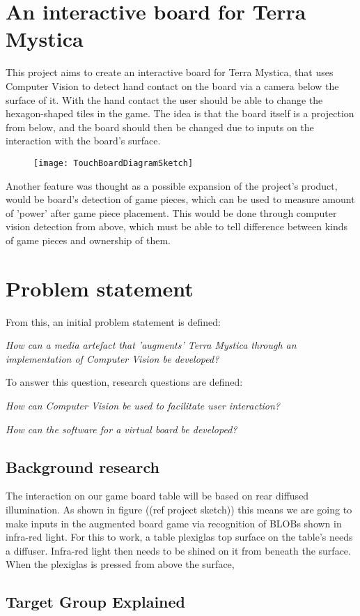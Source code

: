 \section{An interactive board for Terra Mystica}
This project aims to create an interactive board for Terra Mystica, that uses Computer Vision to detect hand contact on the board via a camera below the surface of it. With the hand contact the user should be able to change the hexagon-shaped tiles in the game. The idea is that the board itself is a projection from below, and the board should then be changed due to inputs on the interaction with the board's surface. 

\begin{figure}[!h]
\centering	\texttt{[image: TouchBoardDiagramSketch]}
\end{figure}

Another feature was thought as a possible expansion of the project's product, would be board's detection of game pieces, which can be used to measure amount of 'power' after game piece placement. This would be done through computer vision detection from above, which must be able to tell difference between kinds of game pieces and ownership of them.

\section{Problem statement}
From this, an initial problem statement is defined: 

\textit{How can a media artefact that 'augments' Terra Mystica through an implementation of Computer Vision be developed?}

To answer this question, research questions are defined:

\textit{How can Computer Vision be used to facilitate user interaction?}

\textit{How can the software for a virtual board be developed?}

\subsection{Background research}
The interaction on our game board table will be based on rear diffused illumination.\citep{multiTT} As shown in figure ((ref project sketch)) this means we are going to make inputs in the augmented board game via recognition of BLOBs shown in infra-red light. 
For this to work, a table plexiglas top surface on the table's needs a diffuser. Infra-red light then needs to be shined on it from beneath the surface. When the plexiglas is pressed from above the surface, 



\subsection{Target Group Explained}

